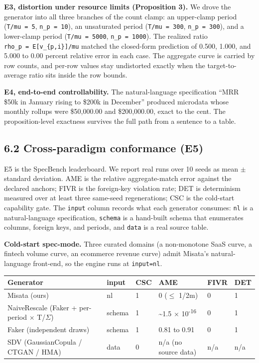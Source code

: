 \textbf{E3, distortion under resource limits (Proposition 3).} We drove
the generator into all three branches of the count clamp: an upper-clamp
period (\texttt{T/\allowbreak{}mu\ =\ 5}, \texttt{n\_\allowbreak{}p\ =\ 10}), an unsaturated
period (\texttt{T/\allowbreak{}mu\ =\ 300}, \texttt{n\_\allowbreak{}p\ =\ 300}), and a lower-clamp
period (\texttt{T/\allowbreak{}mu\ =\ 5000}, \texttt{n\_\allowbreak{}p\ =\ 1000}). The realized
ratio \texttt{rho\_\allowbreak{}p\ =\ E{[}v\_\allowbreak{}\{p,i\}{]}/\allowbreak{}mu} matched the closed-form
prediction of 0.500, 1.000, and 5.000 to 0.00 percent relative error in
each case. The aggregate curve is carried by row counts, and per-row
values stay undistorted exactly when the target-to-average ratio sits
inside the row bounds.

\textbf{E4, end-to-end controllability.} The natural-language
specification ``MRR \$50k in January rising to \$200k in December''
produced microdata whose monthly rollups were \$50,000.00 and
\$200,000.00, exact to the cent. The proposition-level exactness
survives the full path from a sentence to a table.

\hypertarget{cross-paradigm-conformance-e5}{%
\subsection{6.2 Cross-paradigm conformance
(E5)}\label{cross-paradigm-conformance-e5}}

E5 is the SpecBench leaderboard. We report real runs over 10 seeds as
mean \ensuremath{\pm} standard deviation. AME is the relative
aggregate-match error against the declared anchors; FIVR is the
foreign-key violation rate; DET is determinism measured over at least
three same-seed regenerations; CSC is the cold-start capability gate.
The \texttt{input} column records what each generator consumes:
\texttt{nl} is a natural-language specification, \texttt{schema} is a
hand-built schema that enumerates columns, foreign keys, and periods,
and \texttt{data} is a real source table.

\textbf{Cold-start spec-mode.} Three curated domains (a non-monotone
SaaS curve, a fintech volume curve, an ecommerce revenue curve) admit
Misata's natural-language front-end, so the engine runs at
\texttt{input=nl}.

\begin{longtable}[]{@{}llllll@{}}
\toprule
Generator & input & CSC & AME & FIVR & DET\tabularnewline
\midrule
\endhead
Misata (ours) & nl & 1 & 0 (\ensuremath{\le} 1/2m) & 0 &
1\tabularnewline
NaiveRescale (Faker + per-period \ensuremath{\times}
T/\ensuremath{\Sigma}) & schema & 1 & \textasciitilde1.5
\ensuremath{\times} 10\textsuperscript{-16} & 0 & 1\tabularnewline
Faker (independent draws) & schema & 1 & 0.81 to 0.91 & 0 &
1\tabularnewline
SDV (GaussianCopula / CTGAN / HMA) & data & 0 & n/a (no source data) &
n/a & n/a\tabularnewline
\bottomrule
\end{longtable}

